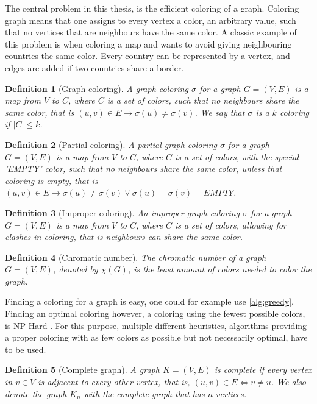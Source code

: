 \documentclass[a4paper]{article}
\newtheorem{definition}{Definition}[section]
\begin{document}
The central problem in this thesis, is the efficient coloring of a graph.
Coloring graph means that one assigns to every vertex a color, an arbitrary
value, such that no vertices that are neighbours have the same color. A classic
example of this problem is when coloring a map and wants to avoid giving
neighbouring countries the same color.  Every country can be represented by a
vertex, and edges are added if two countries share a border.

\begin{definition}[Graph coloring]
    A graph coloring $\sigma$ for a graph $G = (V,E)$ is a map from $V$ to $C$,
    where $C$ is a set of colors, such that no neighbours share the same color,
    that is $(u,v) \in E \to \sigma(u) \neq \sigma(v)$. We say that $\sigma$
    is a $k$ coloring if $|C| \leq k$.
\end{definition}
\begin{definition}[Partial coloring]
    A partial graph coloring $\sigma$ for a graph $G = (V,E)$ is a map from $V$ to $C$,
    where $C$ is a set of colors, with the special 'EMPTY' color, such that no
    neighbours share the same color, unless that coloring is empty, that is
    $(u,v) \in E \to \sigma(u) \neq \sigma(v) \vee \sigma(u) = \sigma(v) = EMPTY$. 
\end{definition}
\begin{definition}[Improper coloring]
    An improper graph coloring $\sigma$ for a graph $G = (V,E)$ is a map from
    $V$ to $C$, where $C$ is a set of colors, allowing for clashes in coloring,
    that is neighbours can share the same color.
\end{definition}
\begin{definition}[Chromatic number]
    The chromatic number of a graph $G = (V,E)$, denoted by $\chi(G)$,
    is the least amount of colors needed to color the graph.
\end{definition}

Finding a coloring for a graph is easy, one could for example use
\autoref{alg:greedy}. Finding an optimal coloring however, a coloring using the
fewest possible colors, is NP-Hard \cite{NPHard}. For this purpose, multiple
different heuristics, algorithms providing a proper coloring with as few colors
as possible but not necessarily optimal, have to be used.

\begin{definition}[Complete graph]
    A graph $K = (V,E)$ is complete if every vertex in $v \in V$ is adjacent to
    every other vertex, that is, $ (u,v) \in E \iff v \neq u$. We also denote the graph $K_n$ with the complete graph that
    has $n$ vertices.
\end{definition}
\end{document}
